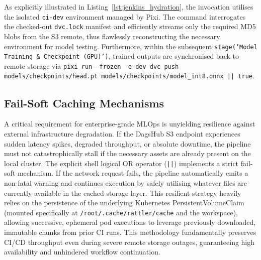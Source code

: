 As explicitly illustrated in Listing~\ref{lst:jenkins_hydration}, the invocation utilises the isolated \texttt{ci-dev} environment managed by Pixi. The command interrogates the checked-out \texttt{dvc.lock} manifest and efficiently streams only the required MD5 blobs from the S3 remote, thus flawlessly reconstructing the necessary environment for model testing. Furthermore, within the subsequent \texttt{stage('Model Training \& Checkpoint (GPU)')}, trained outputs are synchronised back to remote storage via \texttt{pixi run --frozen -e dev dvc push models/checkpoints/head.pt models/checkpoints/model\_int8.onnx || true}.

\subsection{Fail-Soft Caching Mechanisms}
A critical requirement for enterprise-grade MLOps is unyielding resilience against external infrastructure degradation. If the DagsHub S3 endpoint experiences sudden latency spikes, degraded throughput, or absolute downtime, the pipeline must not catastrophically stall if the necessary assets are already present on the local cluster. The explicit shell logical OR operator (\texttt{||}) implements a strict fail-soft mechanism. If the network request fails, the pipeline automatically emits a non-fatal warning and continues execution by safely utilising whatever files are currently available in the cached storage layer. This resilient strategy heavily relies on the persistence of the underlying Kubernetes PersistentVolumeClaim (mounted specifically at \texttt{/root/.cache/rattler/cache} and the workspace), allowing successive, ephemeral pod executions to leverage previously downloaded, immutable chunks from prior CI runs. This methodology fundamentally preserves CI/CD throughput even during severe remote storage outages, guaranteeing high availability and unhindered workflow continuation.
